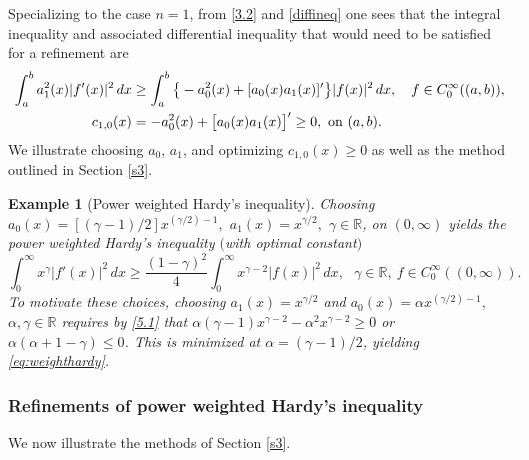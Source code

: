 \documentclass[reqno,10pt,centertags]{amsart}
\newcommand{\bbR}{{\mathbb{R}}}
\renewcommand{\a}{\alpha}
\newcommand{\g}{\gamma}
\numberwithin{equation}{section}
\newtheorem{example}[theorem]{Example}
\theoremstyle{remark}
\begin{document}
Specializing to the case $n=1$, from \eqref{3.2} and \eqref{diffineq} one sees that the integral inequality and associated differential inequality that would need to be satisfied for a refinement are
\begin{align}\label{5.1}
\int_a^b a_1^2(x) |f'(x)|^2\, dx &\geq \int_a^b \big\{-a_0^2(x)+[a_0(x)a_1(x)]'\big\}|f(x)|^2\, dx,\quad f\in C^\infty_0((a,b)),  \notag  
 \\
c_{1,0}(x)&=-a_0^2(x)+\big[a_0(x)a_1(x)\big]'\geq0,\ \text{on}\ (a,b).
\end{align}
We illustrate choosing $a_0$, $a_1$, and optimizing $c_{1,0}(x)\geq0$ as well as the method outlined in Section \ref{s3}.

\begin{example}[Power weighted Hardy's inequality] 
Choosing $a_0(x)=[(\g-1)/2]x^{(\g/2)-1},$ $a_1(x)=x^{\g/2},$ $\g\in\bbR$, on $(0,\infty)$ yields the power weighted Hardy's inequality $($with optimal constant$)$
\begin{equation}\label{eq:weighthardy}
\int_0^\infty x^\gamma |f'(x)|^2\, dx\geq \frac{(1-\gamma)^2}{4}\int_0^\infty x^{\gamma-2}|f(x)|^2\, dx,\ \ \ \g\in\bbR,\ f\in C^\infty_0((0,\infty)).
\end{equation}
To motivate these choices, choosing $a_1(x)=x^{\g/2}$ and $a_0(x)=\a x^{(\g/2)-1},$ $\a,\g\in\bbR$ requires by \eqref{5.1} that $\a(\g-1) x^{\g-2}-\a^2 x^{\g-2}\geq0$ or $\a(\a+1-\g)\leq0$. This is minimized at $\a=(\g-1)/2$, yielding \eqref{eq:weighthardy}.
\end{example}

\subsubsection{Refinements of power weighted Hardy's inequality}

We now illustrate the methods of Section \ref{s3}.
\end{document}
